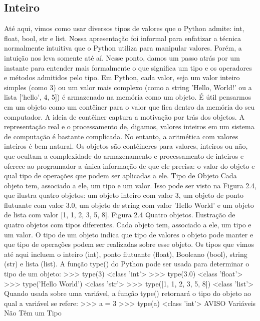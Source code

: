 			\subsection{Inteiro}
			Até aqui, vimos como usar diversos tipos de valores que o Python
			admite: int, float, bool, str e list. Nossa apresentação foi informal para enfatizar a
			técnica normalmente intuitiva que o Python utiliza para manipular valores. Porém, a intuição nos
			leva somente até aí. Nesse ponto, damos um passo atrás por um instante para entender mais
			formalmente o que significa um tipo e os operadores e métodos admitidos pelo tipo.
			Em Python, cada valor, seja um valor inteiro simples (como 3) ou um valor mais complexo
			(como a string 'Hello, World!' ou a lista ['hello', 4, 5]) é armazenado na memória
			como um objeto. É útil pensarmos em um objeto como um contêiner para o valor que fica dentro
			da memória do seu computador.
			A ideia de contêiner captura a motivação por trás dos objetos. A representação real e o
			processamento de, digamos, valores inteiros em um sistema de computação é bastante complicada.
			No entanto, a aritmética com valores inteiros é bem natural. Os objetos são contêineres para
			valores, inteiros ou não, que ocultam a complexidade do armazenamento e processamento de
			inteiros e oferece ao programador a única informação de que ele precisa: o valor do objeto e qual
			tipo de operações que podem ser aplicadas a ele.
			Tipo de Objeto
			Cada objeto tem, associado a ele, um tipo e um valor. Isso pode ser visto na Figura 2.4, que ilustra
			quatro objetos: um objeto inteiro com valor 3, um objeto de ponto flutuante com valor 3.0, um
			objeto de string com valor 'Hello World' e um objeto de lista com valor [1, 1, 2, 3,
			5, 8].
			Figura 2.4 Quatro objetos. Ilustração de quatro objetos com tipos diferentes. Cada objeto tem,
			associado a ele, um tipo e um valor.
			O tipo de um objeto indica que tipo de valores o objeto pode manter e que tipo de operações
			podem ser realizadas sobre esse objeto. Os tipos que vimos até aqui incluem o inteiro (int),
			ponto flutuante (float), Booleano (bool), string (str) e lista (list). A função type() do
			Python pode ser usada para determinar o tipo de um objeto:
			>>> type(3)
			<class 'int'>
			>>> type(3.0)
			<class 'float'>
			>>> type('Hello World')
			<class 'str'>
			>>> type([1, 1, 2, 3, 5, 8])
			<class 'list'>
			Quando usada sobre uma variável, a função type() retornará o tipo do objeto ao qual a variável
			se refere:
			>>> a = 3
			>>> type(a)
			<class 'int'>
			AVISO Variáveis Não Têm um Tipo
